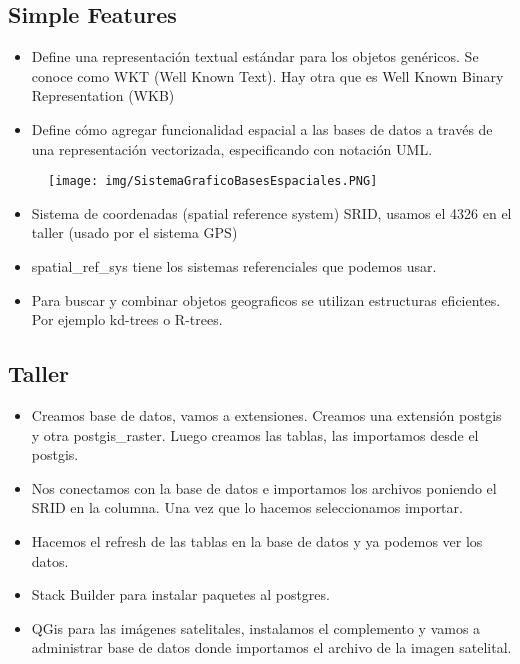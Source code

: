 \subsection*{Simple Features}

\begin{itemize}
\item Define una representación textual estándar para los objetos genéricos. Se conoce como WKT (Well Known Text). Hay otra que es Well Known Binary Representation (WKB)
\item Define cómo agregar funcionalidad espacial a las bases de datos a través de una representación vectorizada, especificando con notación UML.
\end{itemize}

\begin{figure}[htb]
    \centering
    \texttt{[image: img/SistemaGraficoBasesEspaciales.PNG]}
\end{figure}

\begin{itemize}
\item Sistema de coordenadas (spatial reference system) SRID, usamos el 4326 en el taller (usado por el sistema GPS)
\item spatial\_ref\_sys tiene los sistemas referenciales que podemos usar.
\item Para buscar y combinar objetos geograficos se utilizan estructuras eficientes. Por ejemplo kd-trees o R-trees.
\end{itemize}


\subsection*{Taller}

\begin{itemize}
\item Creamos base de datos, vamos a extensiones. Creamos una extensión postgis y otra postgis\_raster. Luego creamos las tablas, las importamos desde el postgis.
\item Nos conectamos con la base de datos e importamos los archivos poniendo el SRID en la columna. Una vez que lo hacemos seleccionamos importar.
\item Hacemos el refresh de las tablas en la base de datos y ya podemos ver los datos.
\item Stack Builder para instalar paquetes al postgres.
\item QGis para las imágenes satelitales, instalamos el complemento y vamos a administrar base de datos donde importamos el archivo de la imagen satelital.
\end{itemize}

